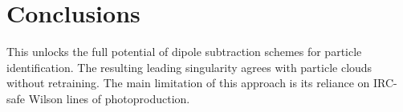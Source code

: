 \section{Conclusions}\label{sec:conclusions}

This unlocks the full potential of dipole subtraction schemes for
particle identification. The resulting leading singularity agrees with
particle clouds without retraining. The main limitation of this approach
is its reliance on IRC-safe Wilson lines of photoproduction.

